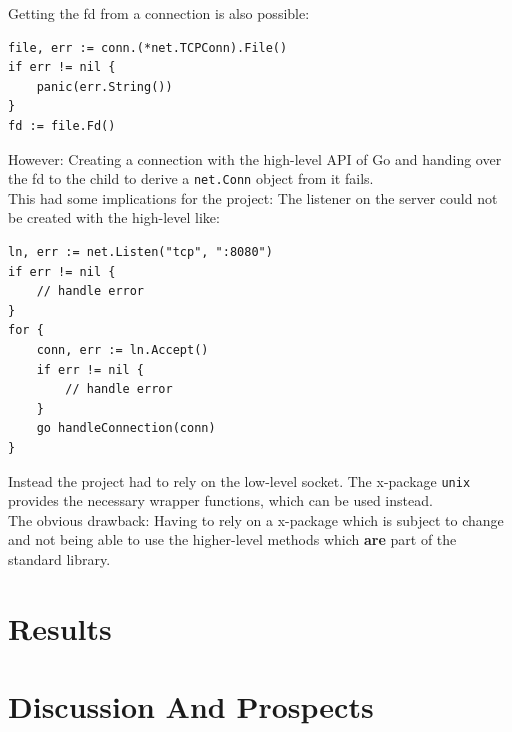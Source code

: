 \documentclass[10pt,a4paper,titlepage,twoside,english,final]{zhawreprt}
\begin{document}
Getting the \gls{fd} from a connection is also possible:
\setlistingGo
\begin{lstlisting}[caption={Getting the \gls{fd} from a \texttt{net.Conn} object},label=lst:FDFromConn]
file, err := conn.(*net.TCPConn).File()
if err != nil {
	panic(err.String())
}
fd := file.Fd()
\end{lstlisting}

However: Creating a connection with the high-level \gls{API} of \gls{Go} and handing over the \gls{fd} to the child to derive a \texttt{net.Conn} object from it fails.\\
This had some implications for the project: The listener on the server could not be created with the high-level like:
\setlistingGo
\begin{lstlisting}[caption={\gls{Go}s high level \gls{API} for listener},label=lst:ListenForConn]
ln, err := net.Listen("tcp", ":8080")
if err != nil {
	// handle error
}
for {
	conn, err := ln.Accept()
	if err != nil {
		// handle error
	}
	go handleConnection(conn)
}
\end{lstlisting}

Instead the project had to rely on the low-level \gls{socket}. The \gls{x-package} \texttt{unix} provides the necessary wrapper functions, which can be used instead.\\
The obvious drawback: Having to rely on a \gls{x-package} which is subject to change and not being able to use the higher-level methods which \textbf{are} part of the standard library.



\chapter{Results}\label{chp:Results}

\chapter{Discussion And Prospects}\label{chp:DiscussionAndProspects}
\end{document}
